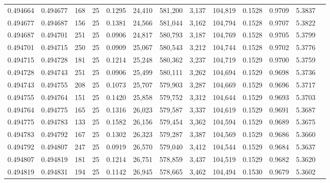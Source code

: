 \begin{tabular}{rrrrrrrrrrrrr}
0.494664 & 0.494677 & 168 &  25 &                                     0.1295 &  24,410 & 581,200 &   3,137 & 104,819 & 0.1528 & 0.9709 & 5.3837 \\
0.494677 & 0.494687 & 156 &  25 &                                     0.1381 &  24,566 & 581,044 &   3,162 & 104,794 & 0.1528 & 0.9707 & 5.3822 \\
0.494687 & 0.494701 & 251 &  25 &                                     0.0906 &  24,817 & 580,793 &   3,187 & 104,769 & 0.1528 & 0.9705 & 5.3799 \\
0.494701 & 0.494715 & 250 &  25 &                                     0.0909 &  25,067 & 580,543 &   3,212 & 104,744 & 0.1528 & 0.9702 & 5.3776 \\
0.494715 & 0.494728 & 181 &  25 &                                     0.1214 &  25,248 & 580,362 &   3,237 & 104,719 & 0.1529 & 0.9700 & 5.3759 \\
0.494728 & 0.494743 & 251 &  25 &                                     0.0906 &  25,499 & 580,111 &   3,262 & 104,694 & 0.1529 & 0.9698 & 5.3736 \\
0.494743 & 0.494755 & 208 &  25 &                                     0.1073 &  25,707 & 579,903 &   3,287 & 104,669 & 0.1529 & 0.9696 & 5.3717 \\
0.494755 & 0.494764 & 151 &  25 &                                     0.1420 &  25,858 & 579,752 &   3,312 & 104,644 & 0.1529 & 0.9693 & 5.3703 \\
0.494764 & 0.494775 & 165 &  25 &                                     0.1316 &  26,023 & 579,587 &   3,337 & 104,619 & 0.1529 & 0.9691 & 5.3687 \\
0.494775 & 0.494783 & 133 &  25 &                                     0.1582 &  26,156 & 579,454 &   3,362 & 104,594 & 0.1529 & 0.9689 & 5.3675 \\
0.494783 & 0.494792 & 167 &  25 &                                     0.1302 &  26,323 & 579,287 &   3,387 & 104,569 & 0.1529 & 0.9686 & 5.3660 \\
0.494792 & 0.494807 & 247 &  25 &                                     0.0919 &  26,570 & 579,040 &   3,412 & 104,544 & 0.1529 & 0.9684 & 5.3637 \\
0.494807 & 0.494819 & 181 &  25 &                                     0.1214 &  26,751 & 578,859 &   3,437 & 104,519 & 0.1529 & 0.9682 & 5.3620 \\
0.494819 & 0.494831 & 194 &  25 &                                     0.1142 &  26,945 & 578,665 &   3,462 & 104,494 & 0.1530 & 0.9679 & 5.3602 \\

\end{tabular}
